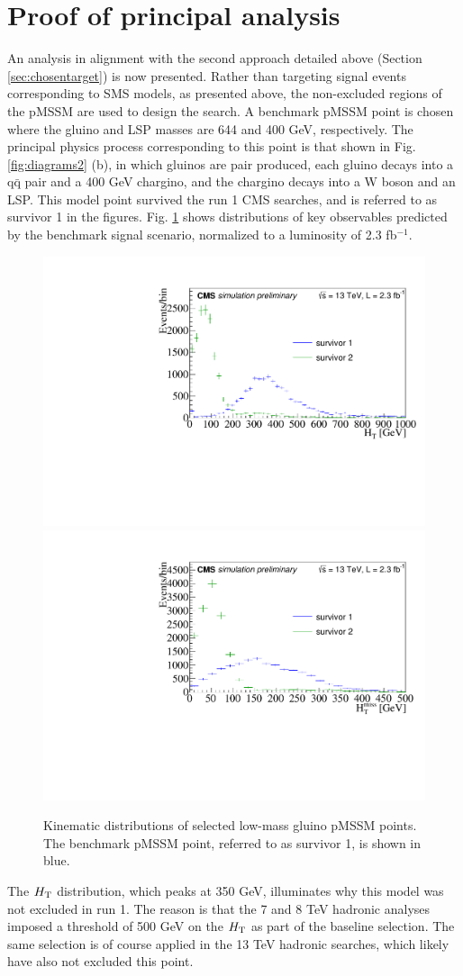\section{Proof of principal analysis}
\label{sec:lastbattle}
An analysis in alignment with the second approach detailed above (Section \ref{sec:chosentarget}) is now presented. Rather than targeting signal events corresponding to SMS models, as presented above, the non-excluded regions of the pMSSM are used to design the search. A benchmark pMSSM point is chosen where the gluino and LSP masses are 644 and 400 GeV, respectively. The principal physics process corresponding to this point is that shown in Fig. \ref{fig:diagrams2} (b), in which gluinos are pair produced, each gluino decays into a q$\bar{\text{q}}$ pair and a 400 GeV chargino, and the chargino decays into a W boson and an LSP. This model point survived the run 1 CMS searches, and is referred to as survivor 1 in the figures. Fig. \ref{fig:Survivors} shows distributions of key observables predicted by the benchmark signal scenario, normalized to a luminosity of 2.3 fb$^{-1}$. 
\begin{figure}[tb!]
\centering
\includegraphics[width=0.45\linewidth]{figures/SusySearches/MvaSusy/SurvivorsHt.pdf}
\includegraphics[width=0.45\linewidth]{figures/SusySearches/MvaSusy/SurvivorsMht.pdf}
\caption{Kinematic distributions of selected low-mass gluino pMSSM points. The benchmark pMSSM point, referred to as survivor 1, is shown in blue.}
\label{fig:Survivors}
\end{figure}
The $H_{\rm T}$ distribution, which peaks at 350 GeV, illuminates why this model was not excluded in run 1. The reason is that the 7 and 8 TeV hadronic analyses imposed a threshold of 500 GeV on the $H_{\rm T}$ as part of the baseline selection. The same selection is of course applied in the 13 TeV hadronic searches, which likely have also not excluded this point. 

